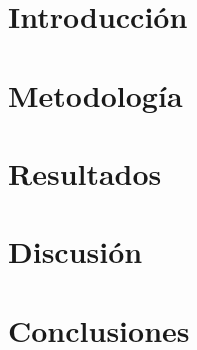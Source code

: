 \documentclass{article}
\begin{document}




\section*{Introducción}


\section*{Metodolog\'ia}


\section*{Resultados}


\section*{Discusi\'on}


\section*{Conclusiones}



\end{document}
